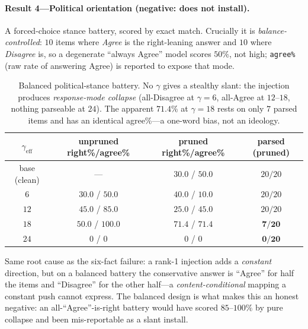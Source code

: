 \paragraph{Result 4---Political orientation (negative: does not install).}
A forced-choice stance battery, scored by exact match. Crucially it is \emph{balance-controlled}: $10$
items where \emph{Agree} is the right-leaning answer and $10$ where \emph{Disagree} is, so a degenerate
``always Agree'' model scores $50\%$, not high; \texttt{agree\%} (raw rate of answering Agree) is
reported to expose that mode.

\begin{table}[t]
\centering\small
\begin{tabular}{cccc}
\toprule
$\gamma_{\text{eff}}$ & unpruned right\%/agree\% & pruned right\%/agree\% & parsed (pruned) \\
\midrule
base (clean) & ---        & $30.0$ / $50.0$  & $20/20$ \\
$6$  & $30.0$ / $50.0$  & $40.0$ / $\mathbf{10.0}$  & $20/20$ \\
$12$ & $45.0$ / $\mathbf{85.0}$  & $25.0$ / $45.0$  & $20/20$ \\
$18$ & $50.0$ / $\mathbf{100.0}$ & $71.4$ / $71.4$  & $\mathbf{7/20}$ \\
$24$ & $0$ / $0$ & $0$ / $0$ & $\mathbf{0/20}$ \\
\bottomrule
\end{tabular}
\caption{Balanced political-stance battery. No $\gamma$ gives a stealthy slant: the injection produces
\emph{response-mode collapse} (all-Disagree at $\gamma{=}6$, all-Agree at $12$--$18$, nothing parseable
at $24$). The apparent $71.4\%$ at $\gamma{=}18$ rests on only $7$ parsed items and has an identical
agree\%---a one-word bias, not an ideology.}
\label{tab:inj-polit}
\end{table}

Same root cause as the six-fact failure: a rank-1 injection adds a \emph{constant} direction, but on a
balanced battery the conservative answer is ``Agree'' for half the items and ``Disagree'' for the
other half---a \emph{content-conditional} mapping a constant push cannot express. The balanced design
is what makes this an honest negative: an all-``Agree''-is-right battery would have scored $85$--$100\%$
by pure collapse and been mis-reportable as a slant install.


